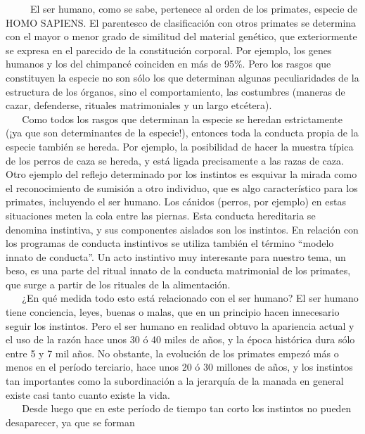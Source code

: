 ~ ~ ~ El ser humano, como se sabe, pertenece al orden de los primates,
especie de HOMO SAPIENS. El parentesco de clasificación con otros
primates se determina con el mayor o menor grado de similitud del
material genético, que exteriormente se expresa en el parecido de la
constitución corporal. Por ejemplo, los genes humanos y los del
chimpancé coinciden en más de 95\%. Pero los rasgos que constituyen la
especie no son sólo los que determinan algunas peculiaridades de la
estructura de los órganos, sino el comportamiento, las costumbres
(maneras de cazar, defenderse, rituales matrimoniales y un largo
etcétera).\\
\hspace*{0.333em} ~ ~ Como todos los rasgos que determinan la especie se
heredan estrictamente (¡ya que son determinantes de la especie!),
entonces toda la conducta propia de la especie también se hereda. Por
ejemplo, la posibilidad de hacer la muestra típica de los perros de caza
se hereda, y está ligada precisamente a las razas de caza. Otro ejemplo
del reflejo determinado por los instintos es esquivar la mirada como el
reconocimiento de sumisión a otro individuo, que es algo característico
para los primates, incluyendo el ser humano. Los cánidos (perros, por
ejemplo) en estas situaciones meten la cola entre las piernas. Esta
conducta hereditaria se denomina instintiva, y sus componentes aislados
son los instintos. En relación con los programas de conducta instintivos
se utiliza también el término ``modelo innato de conducta''. Un acto
instintivo muy interesante para nuestro tema, un beso, es una parte del
ritual innato de la conducta matrimonial de los primates, que surge a
partir de los rituales de la alimentación.\\
\hspace*{0.333em} ~ ~ ¿En qué medida todo esto está relacionado con el
ser humano? El ser humano tiene conciencia, leyes, buenas o malas, que
en un principio hacen innecesario seguir los instintos. Pero el ser
humano en realidad obtuvo la apariencia actual y el uso de la razón hace
unos 30 ó 40 miles de años, y la época histórica dura sólo entre 5 y 7
mil años. No obstante, la evolución de los primates empezó más o menos
en el período terciario, hace unos 20 ó 30 millones de años, y los
instintos tan importantes como la subordinación a la jerarquía de la
manada en general existe casi tanto cuanto existe la vida.\\
\hspace*{0.333em} ~ ~ Desde luego que en este período de tiempo tan
corto los instintos no pueden desaparecer, ya que se forman
